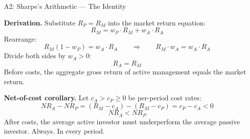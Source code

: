 \documentclass[10pt, aspectratio=169]{beamer}
\begin{document}
\begin{frame}{A2: Sharpe's Arithmetic — The Identity}

  \textbf{Derivation.} Substitute $R_P = R_M$ into the market return equation:
  \[
    R_M = w_P \cdot R_M + w_A \cdot R_A
  \]
  Rearrange:
  \[
    R_M (1 - w_P) = w_A \cdot R_A
    \qquad\Longrightarrow\qquad
    R_M \cdot w_A = w_A \cdot R_A
  \]
  Divide both sides by $w_A > 0$:
  \[
    \boxed{R_A = R_M}
  \]
  \alert{Before costs, the aggregate gross return of active management equals the market return.}

  \vspace{6pt}
  \textbf{Net-of-cost corollary.} Let $c_A > c_P \geq 0$ be per-period cost rates:
  \[
    NR_A - NR_P = (R_M - c_A) - (R_M - c_P) = c_P - c_A < 0
  \]
  \[
    \boxed{NR_A < NR_P}
  \]
  \alert{After costs, the average active investor must underperform the average passive investor.
  Always. In every period.}\\[4pt]

\end{frame}
\end{document}
